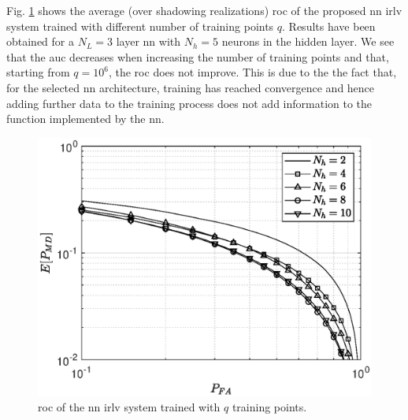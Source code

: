 \documentclass[conference,final]{IEEEtran}
\begin{document}



Fig. \ref{fig:n_train} shows the average (over shadowing realizations) \ac{roc} of the proposed \ac{nn} \ac{irlv} system  trained with different number of training points $q$. Results have been obtained for a $N_L=3$ layer \ac{nn} with $N_h=5$ neurons in the hidden layer. We see that the \ac{auc} decreases when increasing the number of training points and that, starting from $q=10^6$, the \ac{roc} does not improve. This is due to the the fact that, for the selected \ac{nn} architecture, training has reached convergence and hence adding further data to the training process does not add information to the function implemented by the \ac{nn}. 

\begin{figure}[t]
    \centering
    \includegraphics[width=0.9\columnwidth]{res_avg_nNeur_1e5.eps}
    \caption{\ac{roc} of the \ac{nn} \ac{irlv} system trained with $q$ training points.}
    \label{fig:n_train}
\end{figure}
\end{document}
